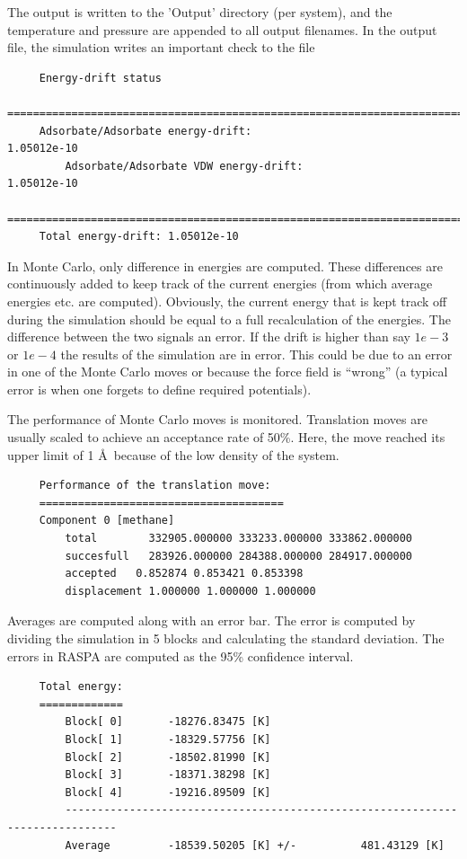 The output is written to the 'Output' directory (per system), and the temperature and pressure are appended to all output filenames.
In the output file, the simulation writes an important check to the file
\begin{tiny}
\begin{verbatim}
     Energy-drift status
     ===========================================================================
     Adsorbate/Adsorbate energy-drift:                                     1.05012e-10
         Adsorbate/Adsorbate VDW energy-drift:                               1.05012e-10
     ===========================================================================
     Total energy-drift: 1.05012e-10
\end{verbatim}
\end{tiny}
In Monte Carlo, only difference in energies are computed. These differences are continuously added to keep track of the current energies
(from which average energies etc. are computed). Obviously, the current energy that is kept track off during the simulation should
be equal to a full recalculation of the energies. The difference between the two signals an error. If the drift is higher than
say $1e-3$ or $1e-4$ the results of the simulation are in error. This could be due to an error in one of the Monte Carlo moves
or because the force field is ``wrong'' (a typical error is when one forgets to define required potentials).

The performance of Monte Carlo moves is monitored. Translation moves are usually scaled to achieve an acceptance rate of 50\%.
Here, the move reached its upper limit of 1 \AA\ because of the low density of the system.
\begin{tiny}
\begin{verbatim}
     Performance of the translation move:
     ======================================
     Component 0 [methane]
         total        332905.000000 333233.000000 333862.000000
         succesfull   283926.000000 284388.000000 284917.000000
         accepted   0.852874 0.853421 0.853398
         displacement 1.000000 1.000000 1.000000
\end{verbatim}
\end{tiny}

Averages are computed along with an error bar. The error is computed by dividing the simulation in 5 blocks and calculating the standard deviation.
The errors in RASPA are computed as the 95\% confidence interval.
\begin{tiny}
\begin{verbatim}
     Total energy:
     =============
         Block[ 0]       -18276.83475 [K]
         Block[ 1]       -18329.57756 [K]
         Block[ 2]       -18502.81990 [K]
         Block[ 3]       -18371.38298 [K]
         Block[ 4]       -19216.89509 [K]
         ------------------------------------------------------------------------------
         Average         -18539.50205 [K] +/-          481.43129 [K]
\end{verbatim}
\end{tiny}

